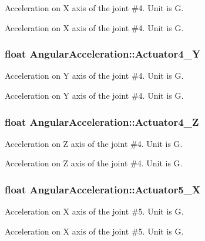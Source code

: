 Acceleration on X axis of the joint \#4. Unit is G. 

Acceleration on X axis of the joint \#4. Unit is G. 
\subsubsection[{\texorpdfstring{Actuator4\+\_\+Y}{Actuator4_Y}}]{\setlength{\rightskip}{0pt plus 5cm}float Angular\+Acceleration\+::\+Actuator4\+\_\+Y}\hypertarget{struct_angular_acceleration_ab19b628ee0ba917a65b5f0ccb4c663c0}{}\label{struct_angular_acceleration_ab19b628ee0ba917a65b5f0ccb4c663c0}


Acceleration on Y axis of the joint \#4. Unit is G. 

Acceleration on Y axis of the joint \#4. Unit is G. 
\subsubsection[{\texorpdfstring{Actuator4\+\_\+Z}{Actuator4_Z}}]{\setlength{\rightskip}{0pt plus 5cm}float Angular\+Acceleration\+::\+Actuator4\+\_\+Z}\hypertarget{struct_angular_acceleration_a4407b12848019a178128df8cd3f7a371}{}\label{struct_angular_acceleration_a4407b12848019a178128df8cd3f7a371}


Acceleration on Z axis of the joint \#4. Unit is G. 

Acceleration on Z axis of the joint \#4. Unit is G. 
\subsubsection[{\texorpdfstring{Actuator5\+\_\+X}{Actuator5_X}}]{\setlength{\rightskip}{0pt plus 5cm}float Angular\+Acceleration\+::\+Actuator5\+\_\+X}\hypertarget{struct_angular_acceleration_a7ae66f2e31c5e90fe07b234e474ead12}{}\label{struct_angular_acceleration_a7ae66f2e31c5e90fe07b234e474ead12}


Acceleration on X axis of the joint \#5. Unit is G. 

Acceleration on X axis of the joint \#5. Unit is G. 
